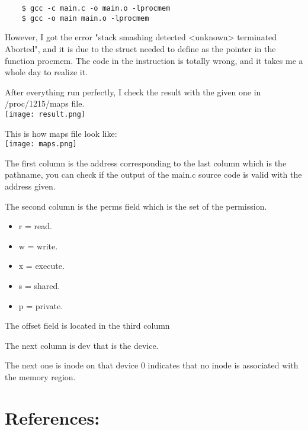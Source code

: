 \documentclass[a4paper, 11pt]{article}
\begin{document}
\begin{verbatim}
    $ gcc -c main.c -o main.o -lprocmem
    $ gcc -o main main.o -lprocmem
\end{verbatim}

\par{However, I got the error "stack smashing detected <unknown> terminated Aborted", and it is due to the struct needed to define as the pointer in the function procmem. The code in the instruction is totally wrong, and it takes me a whole day to realize it.}

\par{After everything run perfectly, I check the result with the given one in /proc/1215/maps file.} \\

\texttt{[image: result.png]}
\bigbreak

\par{This is how maps file look like:}
\\
\texttt{[image: maps.png]}
\bigbreak

\par{The first column is the address corresponding to the last column which is the pathname, you can check if the output of the main.c source code is valid with the address given.}
\par{The second column is the perms field which is the set of the permission.}
\begin{itemize}
    \item r = read.
    \item w = write.
    \item x = execute.
    \item s = shared.
    \item p = private.
\end{itemize}

\par{The offset field is located in the third column}
\par{The next column is dev that is the device.}
\par{The next one is inode on that device 0 indicates that no inode is associated with the memory region.}

\section{References:}

\nocite{FAQ,gjaingjain,kerrisk_2012,pomerantz_2000,shared,tajiryan}


\end{document}

